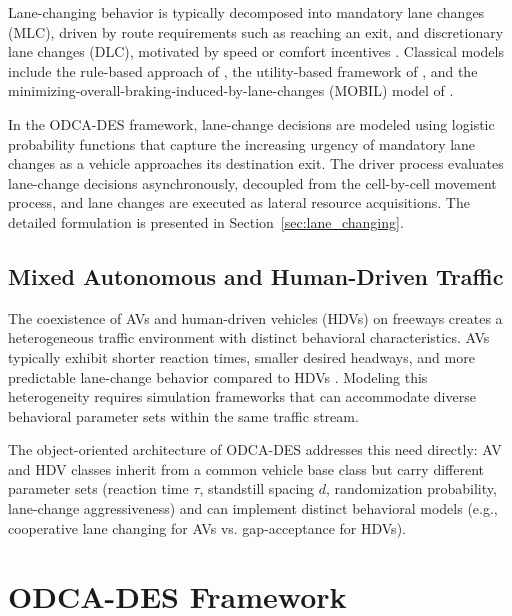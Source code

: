 \documentclass[review,number]{elsarticle}
\begin{document}
Lane-changing behavior is typically decomposed into mandatory lane changes (MLC), driven by route requirements such as reaching an exit, and discretionary lane changes (DLC), motivated by speed or comfort incentives \citep{zheng2014recent}. Classical models include the rule-based approach of \citet{gipps1986model}, the utility-based framework of \citet{toledo2003modeling}, and the minimizing-overall-braking-induced-by-lane-changes (MOBIL) model of \citet{kesting2007general}.

In the ODCA-DES framework, lane-change decisions are modeled using logistic probability functions that capture the increasing urgency of mandatory lane changes as a vehicle approaches its destination exit. The driver process evaluates lane-change decisions asynchronously, decoupled from the cell-by-cell movement process, and lane changes are executed as lateral resource acquisitions. The detailed formulation is presented in Section~\ref{sec:lane_changing}.

\subsection{Mixed Autonomous and Human-Driven Traffic}
\label{sec:lit_mixed}

The coexistence of AVs and human-driven vehicles (HDVs) on freeways creates a heterogeneous traffic environment with distinct behavioral characteristics. AVs typically exhibit shorter reaction times, smaller desired headways, and more predictable lane-change behavior compared to HDVs \citep{talebpour2016influence, shladover2012impacts, vanarem2006effects}. Modeling this heterogeneity requires simulation frameworks that can accommodate diverse behavioral parameter sets within the same traffic stream.

The object-oriented architecture of ODCA-DES addresses this need directly: AV and HDV classes inherit from a common vehicle base class but carry different parameter sets (reaction time $\tau$, standstill spacing $d$, randomization probability, lane-change aggressiveness) and can implement distinct behavioral models (e.g., cooperative lane changing for AVs vs. gap-acceptance for HDVs).


\section{ODCA-DES Framework}
\label{sec:framework}
\end{document}
